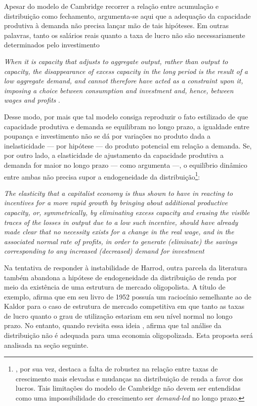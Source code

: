 Apesar do modelo de Cambridge recorrer a relação entre acumulação e distribuição como fechamento, argumenta-se aqui que a adequação da capacidade
produtiva à demanda não precisa lançar mão de tais hipóteses.
Em outras palavras, tanto os salários reais quanto a taxa de lucro não são necessariamente determinados pelo investimento
\begin{citacao}
\textit{When it is
capacity that adjusts to aggregate output, rather than output to
capacity, the disappearance of excess capacity in the long period is
the result of a low aggregate demand, and cannot therefore have
acted as a constraint upon it, imposing a choice between consumption
and investment and, hence, between wages and profits} \cite[p.~50]{halevi_notes_2014}.
\end{citacao}
Desse modo, por mais que tal modelo consiga reproduzir o fato estilizado de que capacidade produtiva e demanda se equilibram no longo prazo, a igualdade entre poupança e investimento não se dá por variações no produto dada a inelasticidade --- por hipótese --- do produto potencial em relação a demanda.
Se, por outro lado, a elasticidade de ajustamento da capacidade produtiva a demanda for maior no longo prazo --- como argumenta \textcite[p.~62--3]{halevi_notes_2014} ---, o equilíbrio dinâmico entre ambas não precisa supor a endogeneidade da distribuição\footnote{\textcite[p.~158]{cesaratto_neo-kaleckian_2015}, por sua vez, destaca a falta de robustez na relação entre taxas de crescimento mais elevadas e mudanças na distribuição de renda a favor dos lucros.
	Tais limitações do modelo de Cambridge não devem ser entendidas como uma impossibilidade do crescimento ser \textit{demand-led} no longo prazo.}:

\begin{citacao}
	\textit{The elasticity that a capitalist economy is thus shown to have in
	reacting to incentives for a more rapid growth by bringing about
	additional productive capacity, or, symmetrically, by eliminating
	excess capacity and erasing the visible traces of the losses in output
	due to a low such incentive, should have already made clear that no
	necessity exists for a change in the real wage, and in the associated
	normal rate of profits, in order to generate (eliminate) the savings
	corresponding to any increased (decreased) demand for investment} \cite[p.~53]{halevi_notes_2014}
\end{citacao}
 

Na tentativa de responder à instabilidade de Harrod, outra parcela da literatura também abandona a hipótese de endogeneidade da distribuição de renda por meio da existência de uma estrutura de mercado oligopolista. A título de exemplo, \textcite{steindl_stagnation_1979} afirma que em seu livro de 1952 \cite{steindl_maturity_1952} possuía um raciocínio semelhante ao de Kaldor para o caso de estrutura de mercado competitiva em que tanto as taxas de lucro quanto o grau de utilização estariam em seu nível normal no longo prazo. No entanto, quando revisita essa ideia \cite{steindl_stagnation_1979}, afirma que tal análise da distribuição não é adequada para uma economia oligopolizada. Esta proposta será analisada na seção seguinte.

